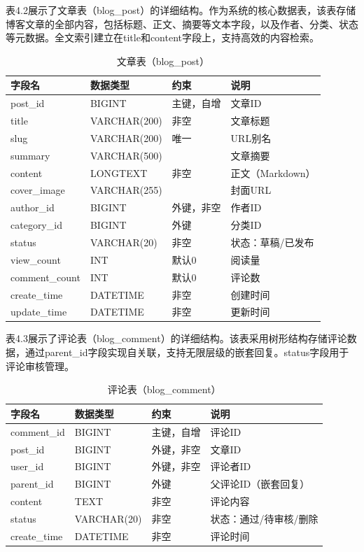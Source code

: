 \documentclass[UTF8,AutoFakeBold=1,AutoFakeSlant,zihao=-4]{SCAU}
\begin{document}
表4.2展示了文章表（blog\_post）的详细结构。作为系统的核心数据表，该表存储博客文章的全部内容，包括标题、正文、摘要等文本字段，以及作者、分类、状态等元数据。全文索引建立在title和content字段上，支持高效的内容检索。

\begin{table}[htbp]
\centering
\caption{文章表（blog\_post）}
\begin{tabular}{p{2.2cm}p{2.5cm}p{2cm}p{4.5cm}}
\toprule
字段名 & 数据类型 & 约束 & 说明 \\
\midrule
post\_id & BIGINT & 主键，自增 & 文章ID \\
title & VARCHAR(200) & 非空 & 文章标题 \\
slug & VARCHAR(200) & 唯一 & URL别名 \\
summary & VARCHAR(500) & & 文章摘要 \\
content & LONGTEXT & 非空 & 正文（Markdown） \\
cover\_image & VARCHAR(255) & & 封面URL \\
author\_id & BIGINT & 外键，非空 & 作者ID \\
category\_id & BIGINT & 外键 & 分类ID \\
status & VARCHAR(20) & 非空 & 状态：草稿/已发布 \\
view\_count & INT & 默认0 & 阅读量 \\
comment\_count & INT & 默认0 & 评论数 \\
create\_time & DATETIME & 非空 & 创建时间 \\
update\_time & DATETIME & 非空 & 更新时间 \\
\bottomrule
\end{tabular}
\end{table}

表4.3展示了评论表（blog\_comment）的详细结构。该表采用树形结构存储评论数据，通过parent\_id字段实现自关联，支持无限层级的嵌套回复。status字段用于评论审核管理。

\begin{table}[htbp]
\centering
\caption{评论表（blog\_comment）}
\begin{tabular}{p{2.2cm}p{2.5cm}p{2cm}p{4.5cm}}
\toprule
字段名 & 数据类型 & 约束 & 说明 \\
\midrule
comment\_id & BIGINT & 主键，自增 & 评论ID \\
post\_id & BIGINT & 外键，非空 & 文章ID \\
user\_id & BIGINT & 外键，非空 & 评论者ID \\
parent\_id & BIGINT & 外键 & 父评论ID（嵌套回复） \\
content & TEXT & 非空 & 评论内容 \\
status & VARCHAR(20) & 非空 & 状态：通过/待审核/删除 \\
create\_time & DATETIME & 非空 & 评论时间 \\
\bottomrule
\end{tabular}
\end{table}
\end{document}

